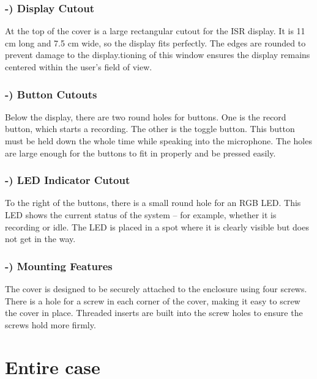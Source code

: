 \subsubsection*{-) Display Cutout}
At the top of the cover is a large rectangular cutout for the ISR display. It is 11 cm long and 7.5 cm wide, so the display fits perfectly. The edges are rounded to prevent damage to the display.tioning of this window ensures the display remains centered within the user's field of view.

\subsubsection*{-) Button Cutouts}
Below the display, there are two round holes for buttons. One is the record button, which starts a recording. The other is the toggle button. This button must be held down the whole time while speaking into the microphone. The holes are large enough for the buttons to fit in properly and be pressed easily.

\subsubsection*{-) LED Indicator Cutout}
To the right of the buttons, there is a small round hole for an RGB LED. This LED shows the current status of the system – for example, whether it is recording or idle. The LED is placed in a spot where it is clearly visible but does not get in the way.

\subsubsection*{-) Mounting Features}
The cover is designed to be securely attached to the enclosure using four screws. There is a hole for a screw in each corner of the cover, making it easy to screw the cover in place. Threaded inserts are built into the screw holes to ensure the screws hold more firmly.

\newpage

\section{Entire case}

